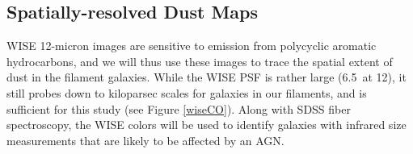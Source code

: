 \documentclass[11pt, preprint]{aastex}
\begin{document}
{%




\vspace*{-1cm}
\subsection{Spatially-resolved Dust Maps}
\vspace*{-.3cm}
\label{wise}
WISE 12-micron images are sensitive to emission from polycyclic
aromatic hydrocarbons, and we will thus use these images to trace the spatial extent of dust in the filament galaxies.  
While the WISE PSF is rather large
(6.5\arcsec \ at 12\micron), it
still probes down to kiloparsec scales for galaxies in our filaments,
and is sufficient for this study (see Figure \ref{wiseCO}).   Along with SDSS fiber
spectroscopy, the WISE colors will be used to identify galaxies with
infrared size measurements that are likely to be affected by an AGN.


}
\end{document}
